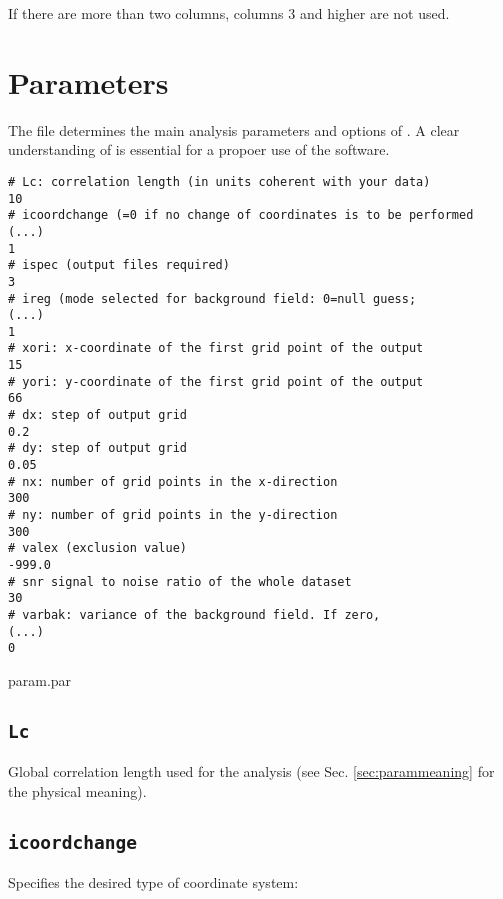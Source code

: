 If there are more than two columns, columns 3 and higher are not used.

\section{Parameters\label{sec:param.par}}

The file  determines the main analysis parameters and options of \diva. A clear understanding of is essential for a propoer use of the software. 

\begin{exfile}[htpb]
\begin{footnotesize}
\begin{verbatim}
# Lc: correlation length (in units coherent with your data)
10
# icoordchange (=0 if no change of coordinates is to be performed (...)
1
# ispec (output files required)
3
# ireg (mode selected for background field: 0=null guess;         (...)
1
# xori: x-coordinate of the first grid point of the output
15
# yori: y-coordinate of the first grid point of the output
66
# dx: step of output grid
0.2
# dy: step of output grid
0.05
# nx: number of grid points in the x-direction
300
# ny: number of grid points in the y-direction
300
# valex (exclusion value)
-999.0
# snr signal to noise ratio of the whole dataset
30
# varbak: variance of the background field. If zero,              (...)
0
\end{verbatim}
\end{footnotesize}
\caption{param.par\label{paramfile}}
\end{exfile}



\subsection{\texttt{Lc}}

Global correlation length used for the analysis (see Sec. \ref{sec:parammeaning} for the physical meaning).

\subsection{\texttt{icoordchange}\label{sec:icoord}}


Specifies the desired type of coordinate system:\\

